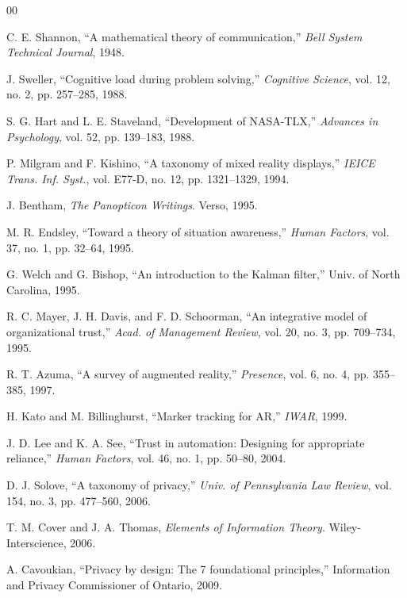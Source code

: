\documentclass[conference]{IEEEtran}
\begin{document}
\begin{thebibliography}{00}

 C. E. Shannon, ``A mathematical theory of communication,'' \textit{Bell System Technical Journal}, 1948.

 J. Sweller, ``Cognitive load during problem solving,'' \textit{Cognitive Science}, vol. 12, no. 2, pp. 257--285, 1988.

 S. G. Hart and L. E. Staveland, ``Development of NASA-TLX,'' \textit{Advances in Psychology}, vol. 52, pp. 139--183, 1988.

 P. Milgram and F. Kishino, ``A taxonomy of mixed reality displays,'' \textit{IEICE Trans. Inf. Syst.}, vol. E77-D, no. 12, pp. 1321--1329, 1994.

 J. Bentham, \textit{The Panopticon Writings}. Verso, 1995.

 M. R. Endsley, ``Toward a theory of situation awareness,'' \textit{Human Factors}, vol. 37, no. 1, pp. 32--64, 1995.

 G. Welch and G. Bishop, ``An introduction to the Kalman filter,'' Univ. of North Carolina, 1995.

 R. C. Mayer, J. H. Davis, and F. D. Schoorman, ``An integrative model of organizational trust,'' \textit{Acad. of Management Review}, vol. 20, no. 3, pp. 709--734, 1995.

 R. T. Azuma, ``A survey of augmented reality,'' \textit{Presence}, vol. 6, no. 4, pp. 355--385, 1997.

 H. Kato and M. Billinghurst, ``Marker tracking for AR,'' \textit{IWAR}, 1999.


 J. D. Lee and K. A. See, ``Trust in automation: Designing for appropriate reliance,'' \textit{Human Factors}, vol. 46, no. 1, pp. 50--80, 2004.

 D. J. Solove, ``A taxonomy of privacy,'' \textit{Univ. of Pennsylvania Law Review}, vol. 154, no. 3, pp. 477--560, 2006.

 T. M. Cover and J. A. Thomas, \textit{Elements of Information Theory}. Wiley-Interscience, 2006.

 A. Cavoukian, ``Privacy by design: The 7 foundational principles,'' Information and Privacy Commissioner of Ontario, 2009.


\end{thebibliography}
\end{document}
